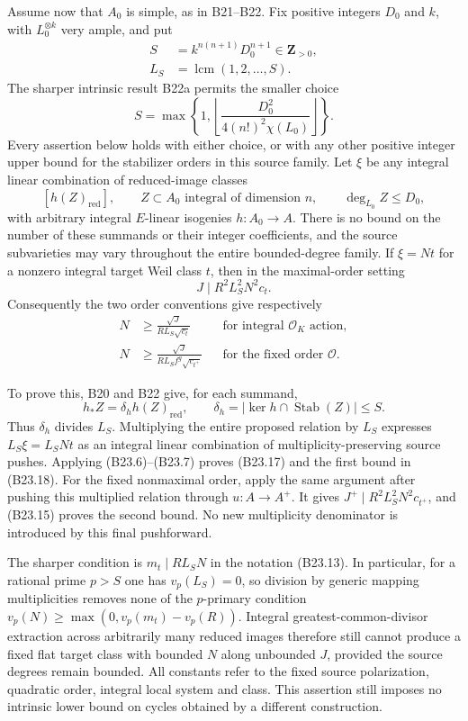 \documentclass[11pt,a4paper]{article}
\theoremstyle{definition}
\begin{document}
Assume now that \(A_0\) is simple, as in B21--B22. Fix positive integers \(D_0\) and \(k\), with \(L_0^{\otimes k}\) very ample, and put \[
 \begin{aligned}
 S&=k^{n(n+1)}D_0^{n+1}\in\mathbf Z_{>0},\\
 L_S&=\operatorname{lcm}(1,2,\ldots,S).
 \end{aligned}
\] The sharper intrinsic result B22a permits the smaller choice \[
 S=\max\left\{1,\left\lfloor
 \frac{D_0^2}{4(n!)^2\chi(L_0)}\right\rfloor\right\}.
\] Every assertion below holds with either choice, or with any other positive integer upper bound for the stabilizer orders in this source family. Let \(\xi\) be any integral linear combination of reduced-image classes \[
 [h(Z)_{\mathrm{red}}],
 \qquad
 Z\subset A_0\text{ integral of dimension }n,
 \qquad \deg_{L_0}Z\le D_0,
\] with arbitrary integral \(E\)-linear isogenies \(h:A_0\to A\). There is no bound on the number of these summands or their integer coefficients, and the source subvarieties may vary throughout the entire bounded-degree family. If \(\xi=Nt\) for a nonzero integral target Weil class \(t\), then in the maximal-order setting \[
 J\mid R^2L_S^2N^2c_t.
\tag{B23.17}
\] Consequently the two order conventions give respectively \[
 \begin{aligned}
 N&\ge\frac{\sqrt J}{R L_S\sqrt{c_t}}
 &&\text{for integral }\mathcal O_K\text{ action},\\
 N&\ge\frac{\sqrt J}{R L_S f^g\sqrt{c_{t^+}}}
 &&\text{for the fixed order }\mathcal O.
 \end{aligned}
\tag{B23.18}
\]

To prove this, B20 and B22 give, for each summand, \[
 h_*Z=\delta_hh(Z)_{\mathrm{red}},\qquad
 \delta_h=|\ker h\cap\operatorname{Stab}(Z)|\le S.
\] Thus \(\delta_h\) divides \(L_S\). Multiplying the entire proposed relation by \(L_S\) expresses \(L_S\xi=L_SN t\) as an integral linear combination of multiplicity-preserving source pushes. Applying (B23.6)--(B23.7) proves (B23.17) and the first bound in (B23.18). For the fixed nonmaximal order, apply the same argument after pushing this multiplied relation through \(u:A\to A^+\). It gives \(J^+\mid R^2L_S^2N^2c_{t^+}\), and (B23.15) proves the second bound. No new multiplicity denominator is introduced by this final pushforward.

The sharper condition is \(m_t\mid RL_SN\) in the notation (B23.13). In particular, for a rational prime \(p>S\) one has \(v_p(L_S)=0\), so division by generic mapping multiplicities removes none of the \(p\)-primary condition \(v_p(N)\ge\max(0,v_p(m_t)-v_p(R))\). Integral greatest-common-divisor extraction across arbitrarily many reduced images therefore still cannot produce a fixed flat target class with bounded \(N\) along unbounded \(J\), provided the source degrees remain bounded. All constants refer to the fixed source polarization, quadratic order, integral local system and class. This assertion still imposes no intrinsic lower bound on cycles obtained by a different construction.
\end{document}
